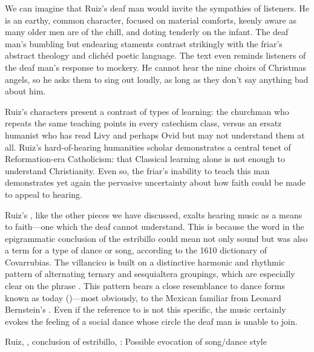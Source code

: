 We can imagine that Ruiz's deaf man would invite the sympathies of listeners.
He is an earthy, common character, focused on material comforts, keenly aware as many older men are of the chill, and doting tenderly on the infant.
The deaf man's bumbling but endearing staments contrast strikingly with the friar's abstract theology and clichéd poetic language.
The text even reminds listeners of the deaf man's response to mockery.
He cannot hear the nine choirs of Christmas angels, so he asks them to sing out loudly, as long as they don't say anything bad about him.

Ruiz's characters present a contrast of types of learning: the churchman who repeats the same teaching points in every catechism class, versus an ersatz humanist who has read Livy and perhaps Ovid but may not understand them at all.
Ruiz's hard-of-hearing humanities scholar demonstrates a central tenet of Reformation-era Catholicism: that Classical learning alone is not enough to understand Christianity.
Even so, the friar's inability to teach this man demonstrates yet again the pervasive uncertainty about how faith could be made to appeal to hearing.

Ruiz's , like the other pieces we have discussed, exalts hearing music as a means to faith---one which the deaf cannot understand.
This is because the word  in the epigrammatic conclusion of the estribillo could mean not only sound but was also a term for a type of dance or song, according to the 1610 dictionary of Covarrubias.
The villancico is built on a distinctive harmonic and rhythmic pattern of alternating ternary and sesquialtera groupings, which are especially clear on the phrase .
This pattern bears a close resemblance to dance forms known as  today ()---most obviously, to the Mexican  familiar from Leonard Bernstein's .%
    \Autocite[]{Grove}
Even if the reference to  is not this specific, the music certainly evokes the feeling of a social dance whose circle the deaf man is unable to join.


\begin{exmusic}
    \caption{Ruiz, , conclusion of estribillo, : Possible evocation of  song/dance style}
    \label{exmusic:Ruiz-Sordos-son}
\end{exmusic}

